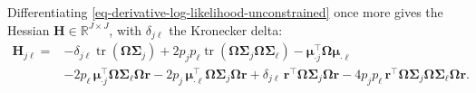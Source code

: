 Differentiating \eqref{eq-derivative-log-likelihood-unconstrained} once more gives the Hessian
\(\mathbf{H}\in\mathbb{R}^{J\times J}\), with \(\delta_{j\ell}\) the Kronecker delta:
\begin{equation}
  \begin{aligned}
    \mathbf{H}_{j\ell}
    ={}&-\delta_{j\ell}\operatorname{tr}(\boldsymbol{\Omega}\boldsymbol{\Sigma}_{j})
       +2p_{j}p_{\ell}\operatorname{tr}(\boldsymbol{\Omega}\boldsymbol{\Sigma}_{j}\boldsymbol{\Omega}\boldsymbol{\Sigma}_{\ell})
       -\boldsymbol{\mu}_{\cdot j}^{\top}\boldsymbol{\Omega}\boldsymbol{\mu}_{\cdot\ell}\\
     &-2p_{\ell}\,\boldsymbol{\mu}_{\cdot j}^{\top}\boldsymbol{\Omega}\boldsymbol{\Sigma}_{\ell}\boldsymbol{\Omega}\boldsymbol{r}
       -2p_{j}\,\boldsymbol{\mu}_{\cdot\ell}^{\top}\boldsymbol{\Omega}\boldsymbol{\Sigma}_{j}\boldsymbol{\Omega}\boldsymbol{r}
       +\delta_{j\ell}\,\boldsymbol{r}^{\top}\boldsymbol{\Omega}\boldsymbol{\Sigma}_{j}\boldsymbol{\Omega}\boldsymbol{r}
       -4p_{j}p_{\ell}\,\boldsymbol{r}^{\top}\boldsymbol{\Omega}\boldsymbol{\Sigma}_{j}\boldsymbol{\Omega}\boldsymbol{\Sigma}_{\ell}\boldsymbol{\Omega}\boldsymbol{r}.
  \end{aligned}
  \label{eq-hessian-log-likelihood-unconstrained}
\end{equation}

